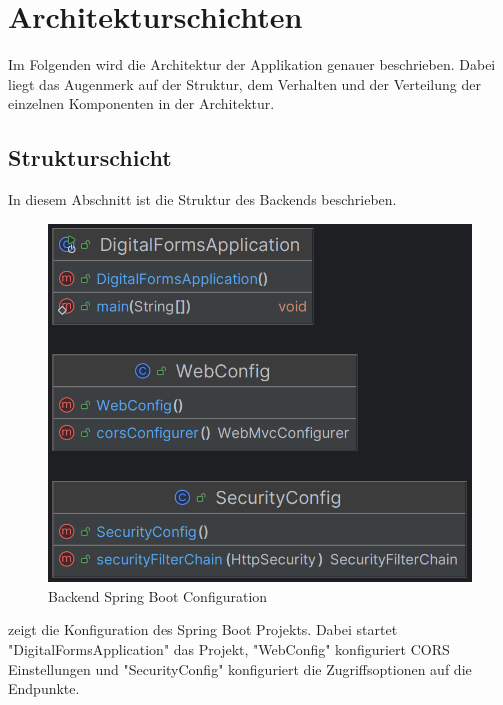 \chapter{Architekturschichten}\label{ch:arrchitekturschichten}
Im Folgenden wird die Architektur der Applikation genauer beschrieben. Dabei liegt das Augenmerk 
auf der Struktur, dem Verhalten und der Verteilung der einzelnen Komponenten in der Architektur.


\section{Strukturschicht}\label{sec:strukturschicht}

In diesem Abschnitt ist die Struktur des Backends beschrieben.

\begin{figure}[H]
    \centering
    \includegraphics[width=15cm]{images/classDiagrams/Config}
    \caption{Backend Spring Boot Configuration}\label{fig:Backend-Spring-Boot-Configuration}
\end{figure}

 zeigt die Konfiguration des Spring Boot Projekts.
Dabei startet "DigitalFormsApplication" das Projekt, "WebConfig" konfiguriert CORS Einstellungen und "SecurityConfig"
konfiguriert die Zugriffsoptionen auf die Endpunkte.

